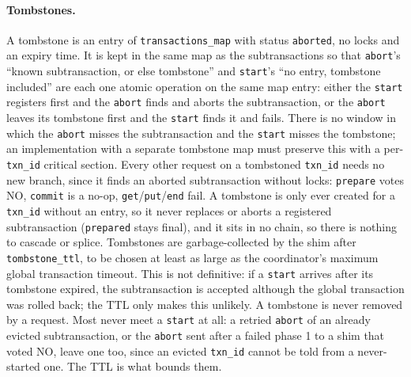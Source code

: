 \documentclass{article}
\begin{document}
\paragraph{Tombstones.}
A tombstone is an entry of \texttt{transactions\_map} with status \texttt{aborted}, no locks and an expiry time. It is kept in the same map as the subtransactions so that \texttt{abort}'s ``known subtransaction, or else tombstone'' and \texttt{start}'s ``no entry, tombstone included'' are each one atomic operation on the same map entry: either the \texttt{start} registers first and the \texttt{abort} finds and aborts the subtransaction, or the \texttt{abort} leaves its tombstone first and the \texttt{start} finds it and fails. There is no window in which the \texttt{abort} misses the subtransaction and the \texttt{start} misses the tombstone; an implementation with a separate tombstone map must preserve this with a per-\texttt{txn\_id} critical section. Every other request on a tombstoned \texttt{txn\_id} needs no new branch, since it finds an aborted subtransaction without locks: \texttt{prepare} votes NO, \texttt{commit} is a no-op, \texttt{get}/\texttt{put}/\texttt{end} fail. A tombstone is only ever created for a \texttt{txn\_id} without an entry, so it never replaces or aborts a registered subtransaction (\texttt{prepared} stays final), and it sits in no chain, so there is nothing to cascade or splice. Tombstones are garbage-collected by the shim after \texttt{tombstone\_ttl}, to be chosen at least as large as the coordinator's maximum global transaction timeout. This is not definitive: if a \texttt{start} arrives after its tombstone expired, the subtransaction is accepted although the global transaction was rolled back; the TTL only makes this unlikely. A tombstone is never removed by a request. Most never meet a \texttt{start} at all: a retried \texttt{abort} of an already evicted subtransaction, or the \texttt{abort} sent after a failed phase 1 to a shim that voted NO, leave one too, since an evicted \texttt{txn\_id} cannot be told from a never-started one. The TTL is what bounds them.
\end{document}

